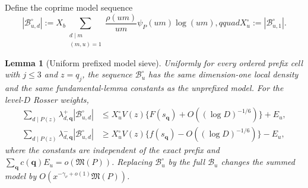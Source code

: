 \documentclass[10pt,reqno]{amsart}
\newcommand{\Bcal}{\mathcal{B}}
\newcommand{\1}{\mathbf{1}}
\theoremstyle{plain}
\newtheorem{lemma}[theorem]{Lemma}
\theoremstyle{remark}
\begin{document}
Define the coprime model sequence
\[
 |\Bcal_{u,d}^{\circ}|:=X_b
 \sum_{\substack{d\mid m\\(m,u)=1}}
 \frac{\rho(um)}{um}\psi_P(um)\log(um),qquad
 X_u^{\circ}:=|\Bcal_{u,1}^{\circ}|.
\]

\begin{lemma}[Uniform prefixed model sieve]
\label{lem:uniform-prefixed-model}
Uniformly for every ordered prefix cell with $j\le3$ and
$z=q_j$, the sequence $\Bcal_u^{\circ}$ has the same dimension-one local
density and the same fundamental-lemma constants as the unprefixed model.
For the level-$D$ Rosser weights,
\begin{align*}
 \sum_{d\mid P(z)}\lambda_{d,\boldsymbol q}^{+}
 |\Bcal_{u,d}^{\circ}|
 &\le X_u^{\circ}V(z)
 \{F(s_{\boldsymbol q})+O((\log D)^{-1/6})\}+E_u,\\
 \sum_{d\mid P(z)}\lambda_{d,\boldsymbol q}^{-}
 |\Bcal_{u,d}^{\circ}|
 &\ge X_u^{\circ}V(z)
 \{f(s_{\boldsymbol q})-O((\log D)^{-1/6})\}-E_u,
\end{align*}
where the constants are independent of the exact prefix and
\(\sum_{\boldsymbol q}c(\boldsymbol q)E_u=o(\mathfrak M(P))\).
Replacing $\Bcal_u^{\circ}$ by the full $\Bcal_u$ changes the summed model
by $O(x^{-\gamma_\nu+o(1)}\mathfrak M(P))$.
\end{lemma}
\end{document}
